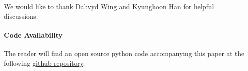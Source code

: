\documentclass[reprint, amsmath, amssymb, floatfix, aps, pra]{revtex4-2}
\begin{document}
    We would like to thank Dahvyd Wing and Kyunghoon Han for helpful discussions.
    \newline

\paragraph*{Code Availability}

The reader will find an open source python code accompanying this paper at the following \href{https://github.com/MatthieuSarkis/qdo}{github repository}.

\appendix



\end{document}
